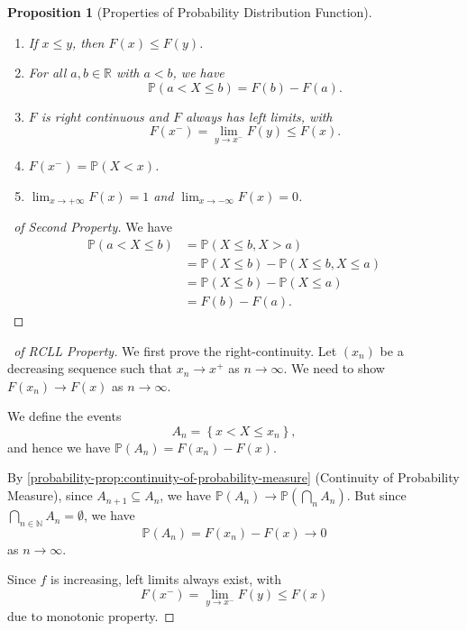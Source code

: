 \documentclass[11pt]{article}
\numberwithin{equation}{section}
\newtheorem{proposition}[theorem]{Proposition}
\theoremstyle{definition}
\theoremstyle{remark}
\newcommand{\pqty}[1]{\left(#1\right)}
\newcommand{\Bqty}[1]{\left\{#1\right\}}
\newcommand{\RR}{\mathbb R}
\newcommand{\NN}{\mathbb N}
\newcommand{\plusinfty}{+\infty}
\newcommand{\minusinfty}{-\infty}
\newcommand{\Prob}{\mathbb P}
\begin{document}
\begin{proposition}[Properties of Probability Distribution Function]\label{probability-proposition-027}
    \label{probability-prop:property-probability-distribution-fn}%
    \begin{enumerate}
        \item If \(x \leq y\), then \(F\pqty{x} \leq F\pqty{y}\).
        \item For all \(a, b \in \RR\) with \(a < b\), we have
        \[
            \Prob\pqty{a < X \leq b} = F\pqty{b} - F\pqty{a}.
        \]
        \item \(F\) is right continuous and \(F\) always has left limits, with
        \[
            F\pqty{x^-} = \lim_{y \to x^-} F\pqty{y} \leq F\pqty{x}.
        \]
        \item \(F\pqty{x^-} = \Prob\pqty{X < x}\).
        \item \(\lim_{x \to \plusinfty} F\pqty{x} = 1\) and \(\lim_{x \to \minusinfty} F\pqty{x} = 0\).
    \end{enumerate}
\end{proposition}

\begin{proof}[\proofname\ of Second Property]\label{probability-proof-054}
    We have
    \begin{align*}
        \Prob\pqty{a < X \leq b} &= \Prob\pqty{X \leq b, X > a} \\
        &= \Prob\pqty{X \leq b} - \Prob\pqty{X \leq b, X \leq a} \\
        &= \Prob\pqty{X \leq b} - \Prob\pqty{X \leq a} \\
        &= F\pqty{b} - F\pqty{a}.
    \end{align*}
\end{proof}

\begin{proof}[\proofname\ of RCLL Property]\label{probability-proof-055}
    We first prove the right-continuity. Let \(\pqty{x_n}\) be a decreasing sequence such that \(x_n \to x^+\) as \(n \to \infty\). We need to show \(F\pqty{x_n} \to F\pqty{x}\) as \(n \to \infty\).

    We define the events
    \[
        A_n = \Bqty{x < X \leq x_n},
    \]
    and hence we have \(\Prob\pqty{A_n} = F\pqty{x_n} - F\pqty{x}\).

    By \autoref{probability-prop:continuity-of-probability-measure} (Continuity of Probability Measure), since \(A_{n + 1} \subseteq A_n\), we have \(\Prob\pqty{A_n} \to \Prob\pqty{\bigcap_n A_n}\). But since \(\bigcap_{n \in \NN} A_n = \emptyset\), we have
    \[
        \Prob\pqty{A_n} = F\pqty{x_n} - F\pqty{x} \to 0
    \]
    as \(n \to \infty\).

    Since \(f\) is increasing, left limits always exist, with
    \[
        F\pqty{x^-} = \lim_{y \to x^-} F\pqty{y} \leq F\pqty{x}
    \]
    due to monotonic property.
\end{proof}
\end{document}
